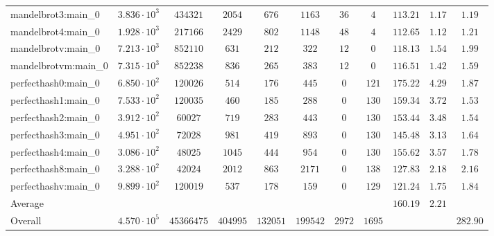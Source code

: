 \begin{tabular}{|l|c|c|c|c|c|c|c|c|c|c|}
mandelbrot3:main\_0            & $ 3.836 \cdot 10^{3} $ & $ 434321   $ & $ 2054   $ & $ 676    $ & $ 1163   $ & $ 36   $ & $ 4    $ & $ 113.21      $ & $ 1.17    $ & $ 1.19    $ \\
mandelbrot4:main\_0            & $ 1.928 \cdot 10^{3} $ & $ 217166   $ & $ 2429   $ & $ 802    $ & $ 1148   $ & $ 48   $ & $ 4    $ & $ 112.65      $ & $ 1.12    $ & $ 1.21    $ \\
mandelbrotv:main\_0            & $ 7.213 \cdot 10^{3} $ & $ 852110   $ & $ 631    $ & $ 212    $ & $ 322    $ & $ 12   $ & $ 0    $ & $ 118.13      $ & $ 1.54    $ & $ 1.99    $ \\
mandelbrotvm:main\_0           & $ 7.315 \cdot 10^{3} $ & $ 852238   $ & $ 836    $ & $ 265    $ & $ 383    $ & $ 12   $ & $ 0    $ & $ 116.51      $ & $ 1.42    $ & $ 1.59    $ \\
perfecthash0:main\_0           & $ 6.850 \cdot 10^{2} $ & $ 120026   $ & $ 514    $ & $ 176    $ & $ 445    $ & $ 0    $ & $ 121  $ & $ 175.22      $ & $ 4.29    $ & $ 1.87    $ \\
perfecthash1:main\_0           & $ 7.533 \cdot 10^{2} $ & $ 120035   $ & $ 460    $ & $ 185    $ & $ 288    $ & $ 0    $ & $ 130  $ & $ 159.34      $ & $ 3.72    $ & $ 1.53    $ \\
perfecthash2:main\_0           & $ 3.912 \cdot 10^{2} $ & $ 60027    $ & $ 719    $ & $ 283    $ & $ 443    $ & $ 0    $ & $ 130  $ & $ 153.44      $ & $ 3.48    $ & $ 1.54    $ \\
perfecthash3:main\_0           & $ 4.951 \cdot 10^{2} $ & $ 72028    $ & $ 981    $ & $ 419    $ & $ 893    $ & $ 0    $ & $ 130  $ & $ 145.48      $ & $ 3.13    $ & $ 1.64    $ \\
perfecthash4:main\_0           & $ 3.086 \cdot 10^{2} $ & $ 48025    $ & $ 1045   $ & $ 444    $ & $ 954    $ & $ 0    $ & $ 130  $ & $ 155.62      $ & $ 3.57    $ & $ 1.78    $ \\
perfecthash8:main\_0           & $ 3.288 \cdot 10^{2} $ & $ 42024    $ & $ 2012   $ & $ 863    $ & $ 2171   $ & $ 0    $ & $ 138  $ & $ 127.83      $ & $ 2.18    $ & $ 2.16    $ \\
perfecthashv:main\_0           & $ 9.899 \cdot 10^{2} $ & $ 120019   $ & $ 537    $ & $ 178    $ & $ 159    $ & $ 0    $ & $ 129  $ & $ 121.24      $ & $ 1.75    $ & $ 1.84    $ \\
\hline
Average                        & $                    $ & $          $ & $        $ & $        $ & $        $ & $      $ & $      $ & $ 160.19      $ & $ 2.21    $ & $         $ \\
\hline
Overall                        & $ 4.570 \cdot 10^{5} $ & $ 45366475 $ & $ 404995 $ & $ 132051 $ & $ 199542 $ & $ 2972 $ & $ 1695 $ & $             $ & $         $ & $ 282.90  $ \\
\hline
\end{tabular}
